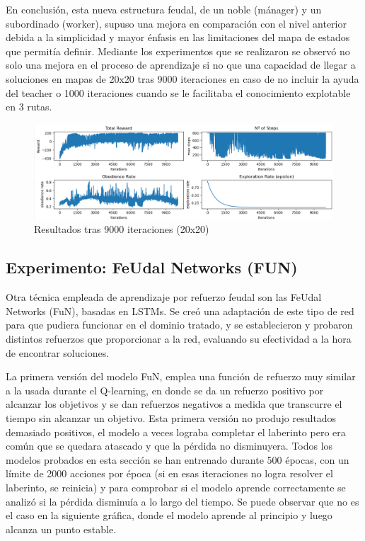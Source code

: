 \documentclass[letterpaper]{article} %
\begin{document}
En conclusión, esta nueva estructura feudal, de un noble (mánager) y un subordinado (worker), supuso una mejora en comparación con el nivel anterior debida a la simplicidad y mayor énfasis en las limitaciones del mapa de estados que permitía definir. Mediante los experimentos que se realizaron se observó no solo una mejora en el proceso de aprendizaje si no que una capacidad de llegar a soluciones en mapas de 20x20 tras 9000 iteraciones en caso de no incluir la ayuda del teacher o 1000 iteraciones cuando se le facilitaba el conocimiento explotable en 3 rutas. 

\begin{figure}[H]
    \centering
    \includegraphics[width=0.9\columnwidth]{QL_resumen_final.png}
    \caption{Resultados tras 9000 iteraciones (20x20)}
    \label{fig:FuN1}
\end{figure}

\subsection{Experimento: FeUdal Networks (FUN)}

Otra técnica empleada de aprendizaje por refuerzo feudal son las FeUdal Networks (FuN), basadas en LSTMs. Se creó una adaptación de este tipo de red para que pudiera funcionar en el dominio tratado, y se establecieron y probaron distintos refuerzos que proporcionar a la red, evaluando su efectividad a la hora de encontrar soluciones.

La primera versión del modelo FuN, emplea una función de refuerzo muy similar a la usada durante el Q-learning, en donde se da un refuerzo positivo por alcanzar los objetivos y se dan refuerzos negativos a medida que transcurre el tiempo sin alcanzar un objetivo. 
Esta primera versión no produjo resultados demasiado positivos, el modelo a veces lograba completar el laberinto pero era común que se quedara atascado y que la pérdida no disminuyera. 
Todos los modelos probados en esta sección se han entrenado durante 500 épocas, con un límite de 2000 acciones por época (si en esas iteraciones no logra resolver el laberinto, 
se reinicia) y para comprobar si el modelo aprende correctamente se analizó si la pérdida disminuía a lo largo del tiempo. Se puede observar que no es el caso en la siguiente gráfica, donde el modelo aprende al principio y luego alcanza un punto estable.
\end{document}
